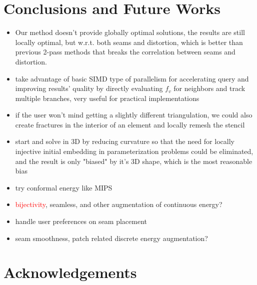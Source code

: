 \section{Conclusions and Future Works}

\begin{itemize}
\item Our method doesn't provide globally optimal solutions, the results are still locally optimal, but w.r.t. both seams and distortion, which is better than previous 2-pass methods that breaks the correlation between seams and distortion.
\item take advantage of basic SIMD type of parallelism for accelerating query and improving results' quality by directly evaluating $f_v$ for neighbors and track multiple branches, very useful for practical implementations
\item if the user won't mind getting a slightly different triangulation, we could also create fractures in the interior of an element and locally remesh the stencil
\item start and solve in 3D by reducing curvature so that the need for locally injective initial embedding in parameterization problems could be eliminated, and the result is only "biased" by it's 3D shape, which is the most reasonable bias
\item try conformal energy like MIPS
\item \textcolor{red}{bijectivity}, seamless, and other augmentation of continuous energy?
\item handle user preferences on seam placement
\item seam smoothness, patch related discrete energy augmentation?
\end{itemize}

\section{Acknowledgements}